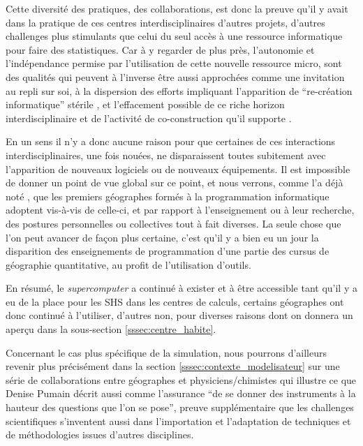 Cette diversité des pratiques, des collaborations, est donc la preuve qu'il y avait dans la pratique de ces centres interdisciplinaires d'autres projets, d'autres challenges plus stimulants que celui du seul accès à une ressource informatique pour faire des statistiques. Car à y regarder de plus près, l'autonomie et l'indépendance permise par l'utilisation de cette nouvelle ressource micro, sont des qualités qui peuvent à l'inverse être aussi approchées comme une invitation au repli sur soi, à la dispersion des efforts impliquant l'apparition de \enquote{re-création informatique} stérile , et l'effacement possible de ce riche horizon interdisciplinaire et de l'activité de co-construction qu'il supporte \autocite{Banos2013}.

En un sens il n'y a donc aucune raison pour que certaines de ces interactions interdisciplinaires, une fois nouées, ne disparaissent toutes subitement avec l'apparition de nouveaux logiciels ou de nouveaux équipements. Il est impossible de donner un point de vue global sur ce point, et nous verrons, comme l'a déjà noté \autocite[372]{Cuyala2014}, que les premiers géographes formés à la programmation informatique adoptent vis-à-vis de celle-ci, et par rapport à l'enseignement ou à leur recherche, des postures personnelles ou collectives tout à fait diverses. La seule chose que l'on peut avancer de façon plus certaine, c'est qu'il y a bien eu un jour la disparition des enseignements de programmation d'une partie des cursus de géographie quantitative, au profit de l'utilisation d'outils.

En résumé, le \textit{supercomputer} a continué à exister et à être accessible tant qu'il y a eu de la place pour les SHS dans les centres de calculs, certains géographes ont donc continué à l'utiliser, d'autres non, pour diverses raisons dont on donnera un aperçu dans la sous-section \ref{sssec:centre_habite}.


Concernant le cas plus spécifique de la simulation, nous pourrons d'ailleurs revenir plus précisément dans la section \ref{sssec:contexte_modelisateur} sur une série de collaborations entre géographes et physiciens/chimistes qui illustre ce que Denise Pumain décrit aussi comme l'assurance \enquote{de se donner des instruments à la hauteur des questions que l'on se pose}, preuve supplémentaire que les challenges scientifiques s'inventent aussi dans l'importation et l'adaptation de techniques et de méthodologies issues d'autres disciplines.

